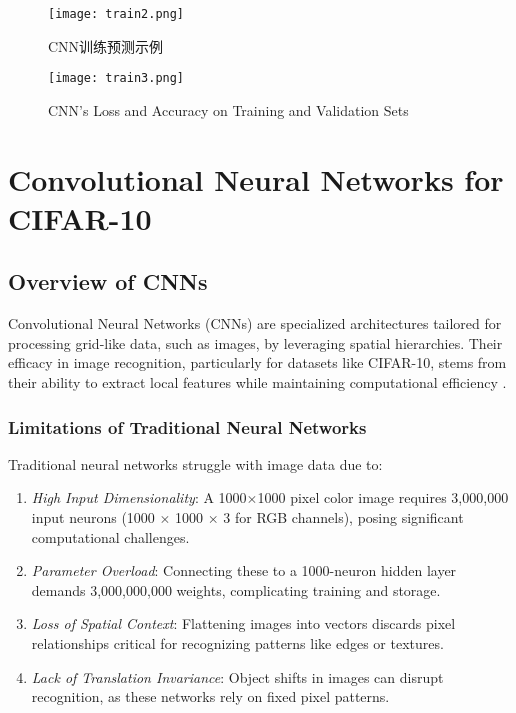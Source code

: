 \documentclass[UTF8]{report}
\theoremstyle{MyLineTheoremStyle} %
\theoremstyle{MyBlockTheoremStyle} %
\theoremstyle{MySubsubsectionStyle} %
\begin{document}
\begin{figure}[H]
    \centering
    \texttt{[image: train2.png]}
    \caption{CNN训练预测示例}
    \label{fig:cnn_validation_accuracy}
\end{figure}

\begin{figure}[H]
    \centering
    \texttt{[image: train3.png]}
    \caption{CNN's Loss and Accuracy on Training and Validation Sets}
    \label{fig:cnn_training_validation_loss_accuracy}
\end{figure}







\cleardoublepage



\section{Convolutional Neural Networks for CIFAR-10}

\subsection{Overview of CNNs}

Convolutional Neural Networks (CNNs) are specialized architectures tailored for processing grid-like data, such as images, by leveraging spatial hierarchies. Their efficacy in image recognition, particularly for datasets like CIFAR-10, stems from their ability to extract local features while maintaining computational efficiency \cite{cifar10}.

\subsubsection{Limitations of Traditional Neural Networks}

Traditional neural networks struggle with image data due to:

\begin{enumerate}[label=\roman*.]
    \item \textit{High Input Dimensionality}: A 1000$\times$1000 pixel color image requires 3,000,000 input neurons (1000 $\times$ 1000 $\times$ 3 for RGB channels), posing significant computational challenges.
    \item \textit{Parameter Overload}: Connecting these to a 1000-neuron hidden layer demands 3,000,000,000 weights, complicating training and storage.
    \item \textit{Loss of Spatial Context}: Flattening images into vectors discards pixel relationships critical for recognizing patterns like edges or textures.
    \item \textit{Lack of Translation Invariance}: Object shifts in images can disrupt recognition, as these networks rely on fixed pixel patterns.
\end{enumerate}
\end{document}
